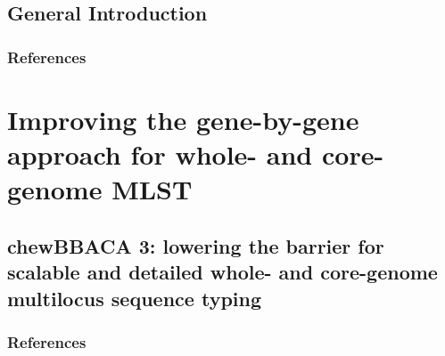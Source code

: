 \documentclass[12pt,a4paper,twoside,openright]{book}
\begin{document}
\begin{sloppy}
\newpage
\thispagestyle{plain}
\renewcommand{\contentsname}{Table of Contents}
\tableofcontents
\clearpage \thispagestyle{empty}\mbox{}\clearpage
\newpage
\thispagestyle{plain}
\listoftables
\clearpage \thispagestyle{empty}\mbox{}\clearpage
\newpage
\thispagestyle{plain}
\listoffigures

\mainmatter

\newpage
\thispagestyle{empty}
\chapter{General Introduction\label{ch:introduction}}
\thispagestyle{empty}
\clearpage \thispagestyle{empty}\mbox{}\clearpage
\newpage
\begin{refsection}

\newpage
\section{References}
\printbibliography[heading=none]
\end{refsection}

\part{Improving the gene-by-gene approach for whole- and core-genome MLST}
\newpage
\thispagestyle{empty}
\chapter{chewBBACA 3: lowering the barrier for scalable and detailed whole- and core-genome multilocus sequence typing\label{ch:paper1}}

\thispagestyle{empty}
\clearpage \thispagestyle{empty}\mbox{}\clearpage
\newpage
\begin{refsection}

\newpage
\section{References}
\printbibliography[heading=none]
\end{refsection}


\end{sloppy}
\end{document}
